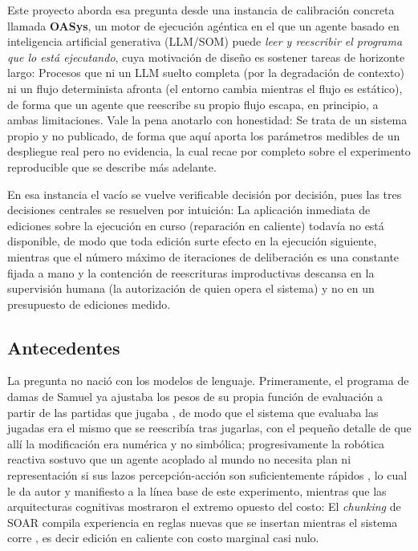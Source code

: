 Este proyecto aborda esa pregunta desde una instancia de calibración concreta llamada \textbf{OASys}, un motor de ejecución agéntica en el que un agente basado en inteligencia artificial generativa (LLM/SOM) puede \emph{leer y reescribir el programa que lo está ejecutando}, cuya motivación de diseño es sostener tareas de horizonte largo: Procesos que ni un LLM suelto completa (por la degradación de contexto) ni un flujo determinista afronta (el entorno cambia mientras el flujo es estático), de forma que un agente que reescribe su propio flujo escapa, en principio, a ambas limitaciones. Vale la pena anotarlo con honestidad: Se trata de un sistema propio y no publicado, de forma que aquí aporta los parámetros medibles de un despliegue real pero no evidencia, la cual recae por completo sobre el experimento reproducible que se describe más adelante.

En esa instancia el vacío se vuelve verificable decisión por decisión, pues las tres decisiones centrales se resuelven por intuición: La aplicación inmediata de ediciones sobre la ejecución en curso (reparación en caliente) todavía no está disponible, de modo que toda edición surte efecto en la ejecución siguiente, mientras que el número máximo de iteraciones de deliberación es una constante fijada a mano y la contención de reescrituras improductivas descansa en la supervisión humana (la autorización de quien opera el sistema) y no en un presupuesto de ediciones medido.

\subsection*{Antecedentes}

La pregunta no nació con los modelos de lenguaje. Primeramente, el programa de damas de Samuel ya ajustaba los pesos de su propia función de evaluación a partir de las partidas que jugaba \parencite{samuel1959some}, de modo que el sistema que evaluaba las jugadas era el mismo que se reescribía tras jugarlas, con el pequeño detalle de que allí la modificación era numérica y no simbólica; progresivamente la robótica reactiva sostuvo que un agente acoplado al mundo no necesita plan ni representación si sus lazos percepción-acción son suficientemente rápidos \parencite{brooks1991intelligence}, lo cual le da autor y manifiesto a la línea base de este experimento, mientras que las arquitecturas cognitivas mostraron el extremo opuesto del costo: El \emph{chunking} de SOAR compila experiencia en reglas nuevas que se insertan mientras el sistema corre \parencite{laird2012soar}, es decir edición en caliente con costo marginal casi nulo.

